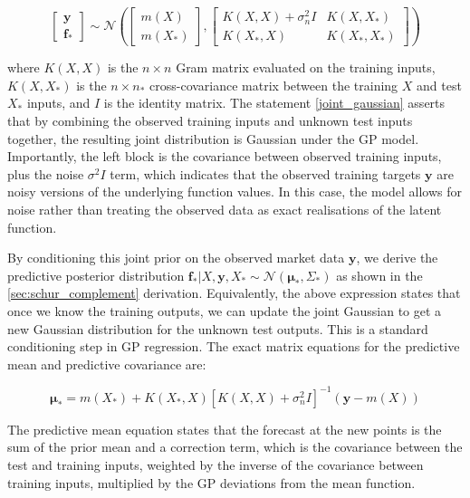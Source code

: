 \documentclass[12pt,oneside]{report}
\theoremstyle{definition}
\theoremstyle{remark}
\begin{document}
\begin{equation}
\begin{bmatrix} \mathbf{y} \\ \mathbf{f}_* \end{bmatrix} \sim \mathcal{N} \left( \begin{bmatrix} m(X) \\ m(X_*) \end{bmatrix}, \begin{bmatrix} K(X, X) + \sigma_n^2 I & K(X, X_*) \\ K(X_*, X) & K(X_*, X_*) \end{bmatrix} \right)
\label{joint_gaussian}
\end{equation}

where $K(X, X)$ is the $n \times n$ Gram matrix evaluated on the training inputs, $K(X, X_*)$ is the $n \times n_*$ cross-covariance matrix between the training $X$ and test $X_*$ inputs, and $I$ is the identity matrix. The statement \ref{joint_gaussian} asserts that by combining the observed training inputs and unknown test inputs together, the resulting joint distribution is Gaussian under the GP model. Importantly, the left block is the covariance between observed training inputs, plus the noise $\sigma^2I$ term, which indicates that the observed training targets $\mathbf{y}$ are noisy versions of the underlying function values. In this case, the model allows for noise rather than treating the observed data as exact realisations of the latent function. 

By conditioning this joint prior on the observed market data $\mathbf{y}$, we derive the predictive posterior distribution $\mathbf{f}_* | X, \mathbf{y}, X_* \sim \mathcal{N}(\boldsymbol{\mu}_*, \Sigma_*)$ as shown in the \ref{sec:schur_complement} derivation. Equivalently, the above expression states that once we know the training outputs, we can update the joint Gaussian to get a new Gaussian distribution for the unknown test outputs. This is a standard conditioning step in GP regression. The exact matrix equations for the predictive mean and predictive covariance are:

\[\boldsymbol{\mu}_* = m(X_*) + K(X_*, X)[K(X, X) + \sigma_n^2 I]^{-1}(\mathbf{y} - m(X))\]

The predictive mean equation states that the forecast at the new points is the sum of the prior mean and a correction term, which is the covariance between the test and training inputs, weighted by the inverse of the covariance between training inputs, multiplied by the GP deviations from the mean function.
\end{document}
